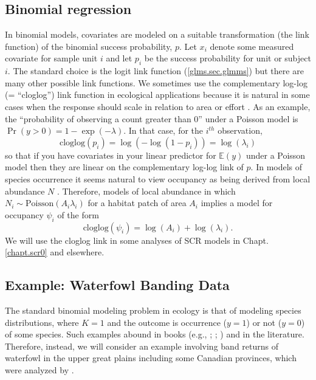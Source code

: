 \subsection{Binomial regression}

In binomial models, covariates are modeled on a suitable
transformation (the link function) of the binomial success
probability, $p$.  Let $x_{i}$ denote some measured covariate for
sample unit $i$ and let $p_{i}$ be the success probability for unit or
subject $i$.
The standard choice is the logit link function (\ref{glms.sec.glmms})
but there are many other possible link functions. 
We sometimes use the
complementary log-log (= ``cloglog'') link function in ecological
applications because it is natural in some cases when the response
should scale in relation to area or effort
\citep[][p. 150]{royle_dorazio:2008}. As an example, the
``probability of observing a count greater than 0'' under a Poisson
model is $\Pr(y>0) = 1-\exp(- \lambda)$. In that case, for the
$i^{th}$ observation,
\[
\mbox{cloglog}(p_{i}) = \log(- \log(1-p_{i})) = \log(\lambda_{i})
\]
so that if you have covariates in your linear predictor for $\mathbb{E}(y)$
under a Poisson model then they are linear on the complementary
log-log link of $p$.
In models of species occurrence it seems natural to view occupancy as
being derived from local abundance $N$
\citep{royle_nichols:2003,royle_dorazio:2006,dorazio:2007}.
Therefore,
models of local abundance in which $N_{i} \sim \mbox{Poisson}(A_{i} \lambda_{i})$
for a habitat patch of area $A_{i}$ implies a model for occupancy $\psi_{i}$
of the form
\[
 \mbox{cloglog}(\psi_{i}) = \log(A_{i}) + \log(\lambda_{i}).
\]
We will use the cloglog link in some analyses of
SCR models in Chapt. \ref{chapt.scr0} and elsewhere.


\subsection{ Example: Waterfowl Banding Data}

The standard binomial modeling problem in ecology is that of 
modeling species distributions, 
 where $K=1$ and the outcome is occurrence ($y=1$) or not
($y=0$) of some species. Such examples abound in books (e.g.,
\citet[][ch. 3]{royle_dorazio:2008}; \citet[][ch. 21]{kery:2010};
\citet[][ch. 13]{kery_schaub:2011}) and in the literature.
Therefore, instead, we will
consider an example involving band returns of waterfowl in the upper great plains including some Canadian provinces, which were
analyzed by \citet{royle_dubovsky:2001}.

